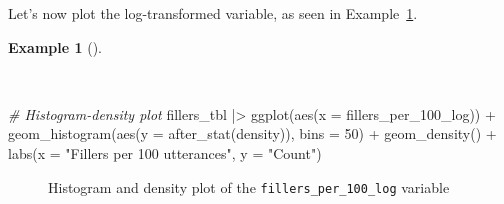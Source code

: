 \documentclass[
  letterpaper,
]{latex/krantz}
\newenvironment{Shaded}{\begin{snugshade}}{\end{snugshade}}
\newcommand{\AttributeTok}[1]{\textcolor[rgb]{0.00,0.00,0.00}{#1}}
\newcommand{\CommentTok}[1]{\textcolor[rgb]{0.00,0.00,0.00}{\textit{#1}}}
\newcommand{\DecValTok}[1]{\textcolor[rgb]{0.00,0.00,0.00}{#1}}
\newcommand{\FunctionTok}[1]{\textcolor[rgb]{0.00,0.00,0.00}{#1}}
\newcommand{\NormalTok}[1]{\textcolor[rgb]{0.00,0.00,0.00}{#1}}
\newcommand{\SpecialCharTok}[1]{\textcolor[rgb]{0.00,0.00,0.00}{#1}}
\newcommand{\StringTok}[1]{\textcolor[rgb]{0.00,0.00,0.00}{#1}}
\theoremstyle{definition}
\newtheorem{example}{Example}[chapter]
\theoremstyle{remark}
\begin{document}
Let's now plot the log-transformed variable, as seen in
Example~\ref{exm-ida-num-uni-log-plot}.

\begin{example}[]\protect\hypertarget{exm-ida-num-uni-log-plot}{}\label{exm-ida-num-uni-log-plot}

~

\begin{Shaded}
\begin{Highlighting}[]
\CommentTok{\# Histogram{-}density plot}
\NormalTok{fillers\_tbl }\SpecialCharTok{|\textgreater{}}
  \FunctionTok{ggplot}\NormalTok{(}\FunctionTok{aes}\NormalTok{(}\AttributeTok{x =}\NormalTok{ fillers\_per\_100\_log)) }\SpecialCharTok{+}
  \FunctionTok{geom\_histogram}\NormalTok{(}\FunctionTok{aes}\NormalTok{(}\AttributeTok{y =} \FunctionTok{after\_stat}\NormalTok{(density)), }\AttributeTok{bins =} \DecValTok{50}\NormalTok{) }\SpecialCharTok{+}
  \FunctionTok{geom\_density}\NormalTok{() }\SpecialCharTok{+}
  \FunctionTok{labs}\NormalTok{(}\AttributeTok{x =} \StringTok{"Fillers per 100 utterances"}\NormalTok{, }\AttributeTok{y =} \StringTok{"Count"}\NormalTok{)}
\end{Highlighting}
\end{Shaded}

\begin{figure}[H]


\caption{\label{fig-ida-num-uni-hist-dens-log}Histogram and density plot
of the \texttt{fillers\_per\_100\_log} variable}

\end{figure}%

\end{example}
\end{document}

